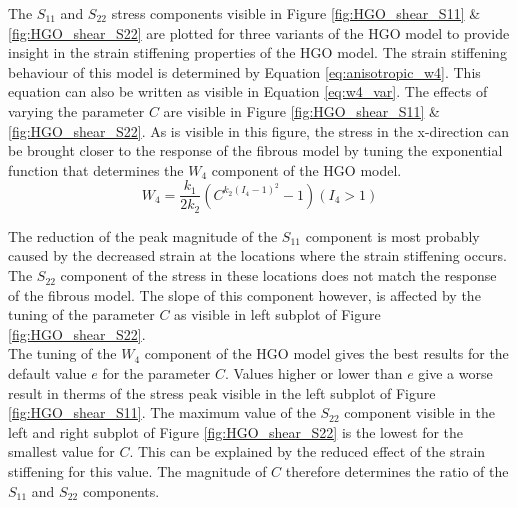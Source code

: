 \qquad The $S_{11}$ and $S_{22}$ stress components visible in Figure \ref{fig:HGO_shear_S11} \& \ref{fig:HGO_shear_S22} are plotted for three variants of the HGO model to provide insight in the strain stiffening properties of the HGO model. The strain stiffening behaviour of this model is determined by Equation \ref{eq:anisotropic_w4}. This equation can also be written as visible in Equation \ref{eq:w4_var}. The effects of varying the parameter $C$ are visible in Figure \ref{fig:HGO_shear_S11} \& \ref{fig:HGO_shear_S22}. As is visible in this figure, the stress in the x-direction can be brought closer to the response of the fibrous model by tuning the exponential function that determines the $W_{4}$ component of the HGO model.\\ 

\begin{equation}
    W_4 = \frac{k_1}{2k_2}(C^{k_2(I_4 - 1)^2} - 1)(I_{4}>1)
    \label{eq:w4_var}
\end{equation}

\qquad The reduction of the peak magnitude of the $S_{11}$ component is most probably caused by the decreased strain at the locations where the strain stiffening occurs. The $S_{22}$ component of the stress in these locations does not match the response of the fibrous model. The slope of this component however, is affected by the tuning of the parameter $C$ as visible in left subplot of Figure \ref{fig:HGO_shear_S22}.\\

\qquad The tuning of the $W_{4}$ component of the HGO model gives the best results for the default value $e$ for the parameter $C$. Values higher or lower than $e$ give a worse result in therms of the stress peak visible in the left subplot of Figure \ref{fig:HGO_shear_S11}. The maximum value of the $S_{22}$ component visible in the left and right subplot of Figure \ref{fig:HGO_shear_S22} is the lowest for the smallest value for $C$. This can be explained by the reduced effect of the strain stiffening for this value. The magnitude of $C$ therefore determines the ratio of the $S_{11}$ and $S_{22}$ components.\\ 

